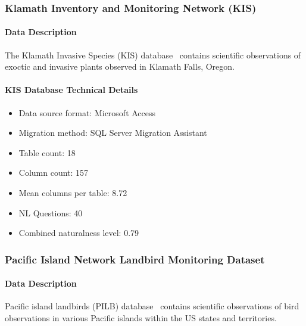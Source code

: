 \subsubsection{Klamath Inventory and Monitoring Network (KIS)}

\paragraph{Data Description}
The Klamath Invasive Species (KIS) database~\cite{klamath-inventory} contains scientific observations of exoctic and invasive plants observed in Klamath Falls, Oregon.


\paragraph{KIS Database Technical Details}
\begin{itemize}
  \item Data source format: Microsoft Access
  \item Migration method: SQL Server Migration Assistant
  \item Table count: 18
  \item Column count: 157
  \item Mean columns per table: 8.72
  \item NL Questions: 40
  \item Combined naturalness level: 0.79 
\end{itemize}

\subsubsection{Pacific Island Network Landbird Monitoring Dataset}

\paragraph{Data Description}
Pacific island landbirds (PILB) database~\cite{pilb-dataset} contains scientific observations of bird observations in various Pacific islands within the US states and territories.


